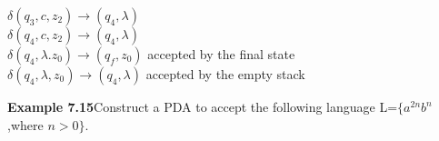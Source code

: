 \documentclass{article}
\begin{document}
	
	\begin{center}
		
		\hspace{1mm}$\delta$$(q_3,c,z_2)\xrightarrow{}(q_4,\lambda)$\\
		$\delta$$(q_4,c,z_2)\xrightarrow{}(q_4,\lambda)$\\
		\hspace{4.3cm}$\delta$$(q_4,\lambda.z_0)\xrightarrow{}(q_f,z_0)$ accepted by the final state\\
		\hspace{4.5cm}$\delta$$(q_4,\lambda,z_0)\xrightarrow{}(q_4,\lambda)$ accepted by the empty stack\\
	\end{center}
	
	
	\begin{flushleft}
		
		
	\textbf{Example 7.15}\hspace{5mm}Construct a PDA to accept the following language L=$\lbrace$$a^{2n}b^{n}$,where $n>0$$\rbrace$.
	\end{flushleft}
	
\end{document}
